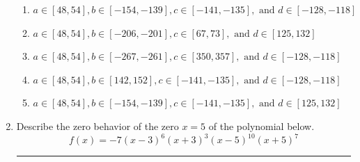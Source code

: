 \documentclass[14pt]{extbook}
\newcommand{\litem}[1]{\item#1\hspace*{-1cm}\rule{\textwidth}{0.4pt}}
\begin{document}
\begin{enumerate}
{\begin{enumerate}[label=\Alph*.]
\item \( a \in [48, 54], b \in [-154, -139], c \in [-141, -135], \text{ and } d \in [-128, -118] \)
\item \( a \in [48, 54], b \in [-206, -201], c \in [67, 73], \text{ and } d \in [125, 132] \)
\item \( a \in [48, 54], b \in [-267, -261], c \in [350, 357], \text{ and } d \in [-128, -118] \)
\item \( a \in [48, 54], b \in [142, 152], c \in [-141, -135], \text{ and } d \in [-128, -118] \)
\item \( a \in [48, 54], b \in [-154, -139], c \in [-141, -135], \text{ and } d \in [125, 132] \)

\end{enumerate} }
\litem{
Describe the zero behavior of the zero $x = 5$ of the polynomial below.\[ f(x) = -7(x - 3)^{6}(x + 3)^{3}(x - 5)^{10}(x + 5)^{7} \]\begin{enumerate}[label=\Alph*.]

\end{enumerate}}
\end{enumerate}
\end{document}
